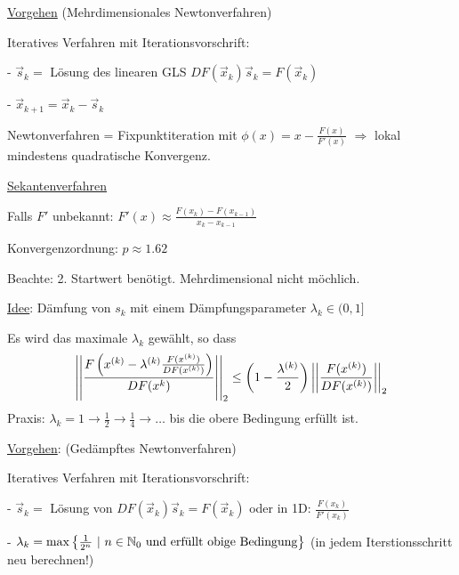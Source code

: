 \underline{Vorgehen}
(Mehrdimensionales Newtonverfahren)

Iteratives Verfahren mit Iterationsvorschrift:

- $\vec{s}_k =$ Lösung des linearen GLS $DF(\vec{x}_k) \vec{s}_k = F (\vec{x}_k)$

- $\vec{x}_{k+1} = \vec{x}_k - \vec{s}_k$

Newtonverfahren = Fixpunktiteration mit $\phi(x) = x- \frac{F(x)}{F'(x)}$
$\Rightarrow$ lokal mindestens quadratische Konvergenz.

\vspace{1\baselineskip}

\underline{Sekantenverfahren}

Falls $F'$ unbekannt: $F'(x) \approx \frac{F(x_k) - F(x_{k-1})}{x_k - x_{k-1}}$

Konvergenzordnung: $p \approx 1.62$

Beachte: 2. Startwert benötigt. Mehrdimensional nicht möchlich.

\vspace{1\baselineskip}

\underline{}

\vspace{1\baselineskip}

\underline{Idee}:
Dämfung von $s_k$ mit einem Dämpfungsparameter $\lambda_k \in (0,1]$

Es wird das maximale $\lambda_k$ gewählt, so dass
\begin{align*}
    \left\vert\left\vert \frac{F \left( x^{(k)} - \lambda^{(k)} \frac{F(x^{(k)})}{DF(x^{(k)})} \right)}{DF(x^{k})} \right\vert\right\vert_2
    \leq
    \left( 1-\frac{\lambda^{(k)}}{2} \right) \left\vert\left\vert \frac{F(x^{(k)})}{DF(x^{(k)})} \right\vert\right\vert_2
\end{align*}
Praxis: $\lambda_k = 1 \rightarrow \frac{1}{2} \rightarrow \frac{1}{4} \rightarrow \dots$
bis die obere Bedingung erfüllt ist.

\vspace{1\baselineskip}

\underline{Vorgehen}:
(Gedämpftes Newtonverfahren)

Iteratives Verfahren mit Iterationsvorschrift:

- $\vec{s}_k =$ Lösung von $DF(\vec{x}_k) \vec{s}_k = F(\vec{x}_k)$ oder in 1D: $\frac{F(x_k)}{F'(x_k)}$

- $\lambda_k = \max \left\{ \frac{1}{2^n} \ | \ n \in \mathbb{N}_0 \text{ und erfüllt obige Bedingung} \right\}$
(in jedem Iterstionsschritt neu berechnen!)


